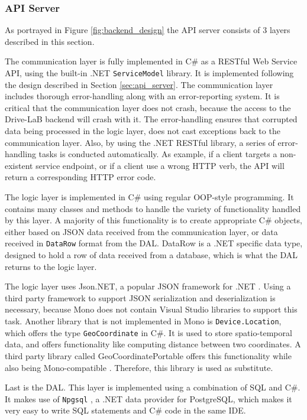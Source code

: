 \subsubsection{API Server}\label{subsec:impl_api_server}
As portrayed in Figure \ref{fig:backend_design} the API server consists of 3 layers described in this section.

The communication layer is fully implemented in C\# as a RESTful Web Service API, using the built-in .NET \texttt{ServiceModel} library. It is implemented following the design described in Section \ref{sec:api_server}. The communication layer includes thorough error-handling along with an error-reporting system. It is critical that the communication layer does not crash, because the access to the Drive-LaB backend will crash with it. The error-handling ensures that corrupted data being processed in the logic layer, does not cast exceptions back to the communication layer. Also, by using the .NET RESTful library, a series of error-handling tasks is conducted automatically. As example, if a client targets a non-existent service endpoint, or if a client use a wrong HTTP verb, the API will return a corresponding HTTP error code.

The logic layer is implemented in C\# using regular OOP-style programming. It contains many classes and methods to handle the variety of functionality handled by this layer. A majority of this functionality is to create appropriate C\# objects, either based on JSON data received from the communication layer, or data received in \texttt{DataRow} format from the DAL. DataRow is a .NET specific data type, designed to hold a row of data received from a database, which is what the DAL returns to the logic layer.  

The logic layer uses Json.NET, a popular JSON framework for .NET \citep{json_dot_net}. Using a third party framework to support JSON serialization and deserialization is necessary, because Mono does not contain Visual Studio libraries to support this task. Another library that is not implemented in Mono is \texttt{Device.Location}, which offers the type \texttt{GeoCoordinate} in C\#. It is used to store spatio-temporal data, and offers functionality like computing distance between two coordinates. A third party library called GeoCoordinatePortable offers this functionality while also being Mono-compatible \citep{geocoordinateportable}. Therefore, this library is used as substitute.

Last is the DAL. This layer is implemented using a combination of SQL and C\#. It makes use of \texttt{Npgsql} \citep{npgsql}, a .NET data provider for PostgreSQL, which makes it very easy to write SQL statements and C\# code in the same IDE. 